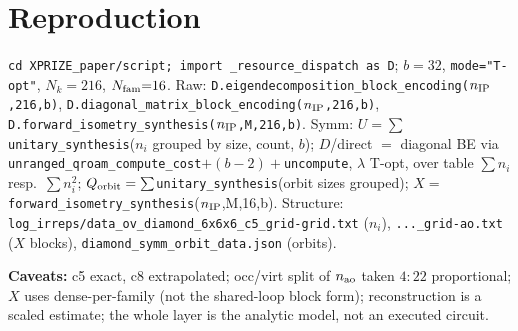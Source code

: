 \documentclass[11pt]{article}
\newcommand{\code}[1]{\texttt{\small #1}}
\begin{document}
\section*{Reproduction}
\code{cd XPRIZE\_paper/script; import \_resource\_dispatch as D}; $b{=}32$, \code{mode="T-opt"},
$N_k{=}216$, $N_{\rm fam}{=}16$.
Raw: \code{D.eigendecomposition\_block\_encoding($n_{\rm IP}$,216,b)}, \code{D.diagonal\_matrix\_block\_encoding($n_{\rm IP}$,216,b)},
\code{D.forward\_isometry\_synthesis($n_{\rm IP}$,M,216,b)}.
Symm: $U={\sum}$\code{unitary\_synthesis}($n_i$ grouped by size, count, $b$); $D$/direct $=$ diagonal BE via
\code{unranged\_qroam\_compute\_cost}$+(b{-}2)+$\code{uncompute}, $\lambda$ T-opt, over table $\sum n_i$ resp.\ $\sum n_i^2$;
$Q_{\rm orbit}={\sum}$\code{unitary\_synthesis}(orbit sizes grouped); $X=$\code{forward\_isometry\_synthesis}($n_{\rm IP}$,M,16,b).
Structure: \code{log\_irreps/data\_ov\_diamond\_6x6x6\_c5\_grid-grid.txt} ($n_i$),
\code{...\_grid-ao.txt} ($X$ blocks), \code{diamond\_symm\_orbit\_data.json} (orbits).

\textbf{Caveats:} c5 exact, c8 extrapolated; occ/virt split of $n_{\rm ao}$ taken $4{:}22$ proportional;
$X$ uses dense-per-family (not the shared-loop block form); reconstruction is a scaled estimate; the
whole layer is the analytic model, not an executed circuit.
\end{document}

